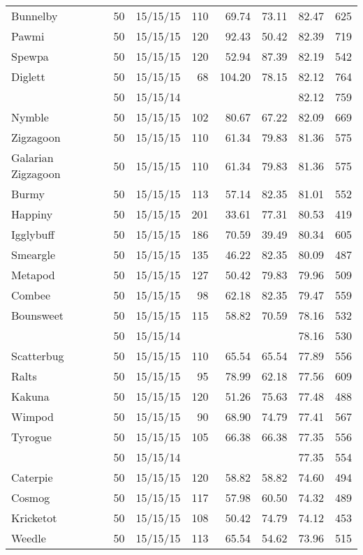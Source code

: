 \begin{longtable}{lrrrrrrr}
Bunnelby & 50 & 15/15/15 & 110 & 69.74 & 73.11 & 82.47 &  625\\
Pawmi & 50 & 15/15/15 & 120 & 92.43 & 50.42 & 82.39 &  719\\
Spewpa & 50 & 15/15/15 & 120 & 52.94 & 87.39 & 82.19 &  542\\
Diglett & 50 & 15/15/15 & 68 & 104.20 & 78.15 & 82.12 &  764\\
 & 50 & 15/15/14 & & & & 82.12 &  759\\
Nymble & 50 & 15/15/15 & 102 & 80.67 & 67.22 & 82.09 &  669\\
Zigzagoon & 50 & 15/15/15 & 110 & 61.34 & 79.83 & 81.36 &  575\\
Galarian Zigzagoon & 50 & 15/15/15 & 110 & 61.34 & 79.83 & 81.36 &  575\\
Burmy & 50 & 15/15/15 & 113 & 57.14 & 82.35 & 81.01 &  552\\
Happiny & 50 & 15/15/15 & 201 & 33.61 & 77.31 & 80.53 &  419\\
Igglybuff & 50 & 15/15/15 & 186 & 70.59 & 39.49 & 80.34 &  605\\
Smeargle & 50 & 15/15/15 & 135 & 46.22 & 82.35 & 80.09 &  487\\
Metapod & 50 & 15/15/15 & 127 & 50.42 & 79.83 & 79.96 &  509\\
Combee & 50 & 15/15/15 & 98 & 62.18 & 82.35 & 79.47 &  559\\
Bounsweet & 50 & 15/15/15 & 115 & 58.82 & 70.59 & 78.16 &  532\\
 & 50 & 15/15/14 & & & & 78.16 &  530\\
Scatterbug & 50 & 15/15/15 & 110 & 65.54 & 65.54 & 77.89 &  556\\
Ralts & 50 & 15/15/15 & 95 & 78.99 & 62.18 & 77.56 &  609\\
Kakuna & 50 & 15/15/15 & 120 & 51.26 & 75.63 & 77.48 &  488\\
Wimpod & 50 & 15/15/15 & 90 & 68.90 & 74.79 & 77.41 &  567\\
Tyrogue & 50 & 15/15/15 & 105 & 66.38 & 66.38 & 77.35 &  556\\
 & 50 & 15/15/14 & & & & 77.35 &  554\\
Caterpie & 50 & 15/15/15 & 120 & 58.82 & 58.82 & 74.60 &  494\\
Cosmog & 50 & 15/15/15 & 117 & 57.98 & 60.50 & 74.32 &  489\\
Kricketot & 50 & 15/15/15 & 108 & 50.42 & 74.79 & 74.12 &  453\\
Weedle & 50 & 15/15/15 & 113 & 65.54 & 54.62 & 73.96 &  515\\

\end{longtable}

